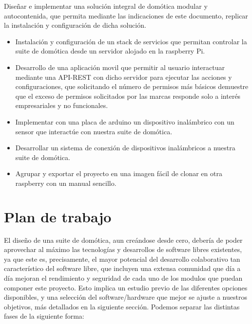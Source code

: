 Diseñar e implementar una solución integral de domótica modular y autocontenida, que permita mediante las indicaciones de este documento, replicar la instalación y configuración de dicha solución.
\begin{itemize}
  \item Instalación y configuración de un stack de servicios que permitan controlar la suite de domótica desde un servidor alojado en la raspberry Pi.

  \item Desarrollo de una aplicación movil que permitir al usuario interactuar mediante una API-REST con dicho servidor para ejecutar las acciones y configuraciones, que solicitando el número de permisos más básicos demuestre que el exceso de permisos solicitados por las marcas responde solo a interés empresariales y no funcionales.

  \item Implementar con una placa de arduino un dispositivo inalámbrico con un sensor que interactúe con nuestra suite de domótica.

  \item Desarrollar un sistema de conexión de dispositivos inalámbricos a nuestra suite de domótica.

  \item Agrupar y exportar el proyecto en una imagen fácil de clonar en otra raspberry con un manual sencillo.
\end{itemize}

\section{Plan de trabajo}
\label{ch:Capitulo1.3}

El diseño de una suite de domótica, aun creándose desde cero, debería de poder aprovechar al máximo las tecnologías y desarrollos de software libres existentes, ya que este es, precisamente, el mayor potencial del desarrollo colaborativo tan característico del software libre, que incluyen una extensa comunidad que día a día mejoran el rendimiento y seguridad de cada uno de los modulos que puedan componer este proyecto. Esto implica un estudio previo de las diferentes opciones disponibles, y una selección del software/hardware que mejor se ajuste a nuestros objetivos, más detallados en la siguiente sección. Podemos separar las distintas fases de la siguiente forma:

